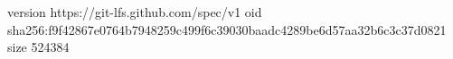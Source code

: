 version https://git-lfs.github.com/spec/v1
oid sha256:f9f42867e0764b7948259c499f6c39030baadc4289be6d57aa32b6c3c37d0821
size 524384
